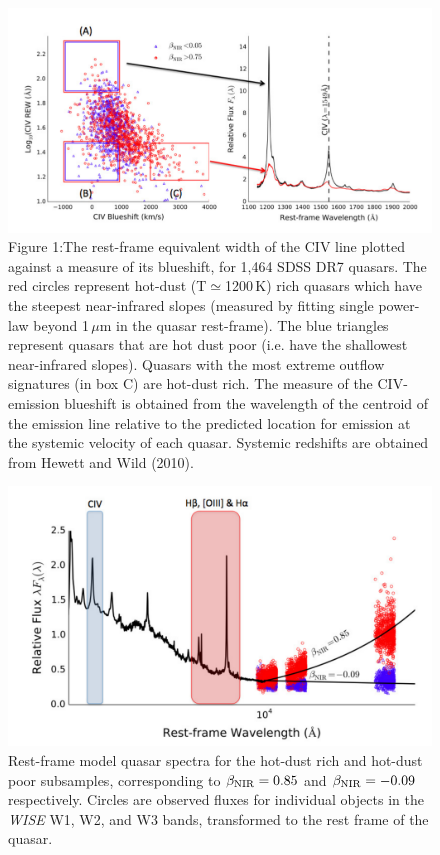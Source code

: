 \begin{figure}
\centering
  \includegraphics[width=\columnwidth]{figures/chapter06/wht_coatman_fig1.pdf}
\caption{Figure 1:The rest-frame equivalent width of the CIV line
plotted against a measure of its blueshift, for 1,464 SDSS DR7
quasars. The red circles represent hot-dust (T$\simeq$1200\,K) rich
quasars which have the steepest near-infrared slopes (measured by
fitting single power-law beyond 1\,$\mu$m in the quasar rest-frame). The
blue triangles represent quasars that are hot dust poor (i.e. have the
shallowest near-infrared slopes). Quasars with the most extreme
outflow signatures (in box C) are hot-dust rich. The measure of the CIV-emission blueshift is obtained from the
wavelength of the centroid of the emission line relative to the
predicted location for emission at the systemic velocity of each
quasar. Systemic redshifts are obtained from Hewett and Wild (2010).}
  \label{fig:}
\end{figure}

\begin{figure}
\centering
  \includegraphics[width=\columnwidth]{figures/chapter06/wht_coatman_fig2.pdf}
\caption{Rest-frame model quasar spectra for the hot-dust rich and hot-dust poor subsamples, corresponding to $\beta_{\rm NIR} = 0.85$ and $\beta_{\rm NIR} = -0.09$ respectively.  Circles are observed fluxes for individual objects in the {\it WISE} W1, W2, and W3 bands, transformed to the rest frame of the quasar. }
  \label{fig:}
\end{figure}

